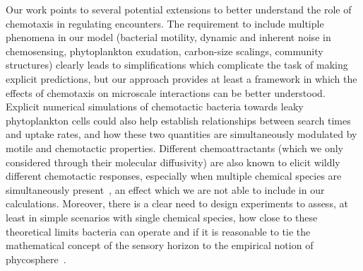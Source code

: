 \documentclass[9pt,twocolumn,twoside]{pnas-new}
\begin{document}
Our work points to several potential extensions to better understand the role of chemotaxis in regulating encounters. The requirement to include multiple phenomena in our model (bacterial motility, dynamic and inherent noise in chemosensing, phytoplankton exudation, carbon-size scalings, community structures) clearly leads to simplifications which complicate the task of making explicit predictions, but our approach provides at least a framework in which the effects of chemotaxis on microscale interactions can be better understood. 
Explicit numerical simulations of chemotactic bacteria towards leaky phytoplankton cells could also help establish relationships between search times and uptake rates, and how these two quantities are simultaneously modulated by motile and chemotactic properties. Different chemoattractants (which we only considered through their molecular diffusivity) are also known to elicit wildly different chemotactic responses, especially when multiple chemical species are simultaneously present~\cite{clerc2023strong}, an effect which we are not able to include in our calculations.
Moreover, there is a clear need to design experiments to assess, at least in simple scenarios with single chemical species, how close to these theoretical limits bacteria can operate and if it is reasonable to tie the mathematical concept of the sensory horizon to the empirical notion of phycosphere~\cite{seymour2017zooming,bell1972chemotactic,platt2023probing}.
\end{document}
